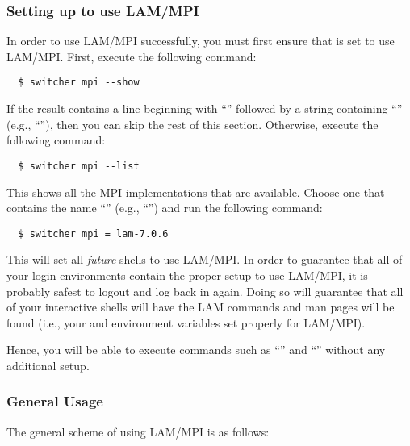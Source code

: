 \subsubsection{Setting up  to use LAM/MPI}

In order to use LAM/MPI successfully, you must first ensure that
 is set to use LAM/MPI.  First, execute the following
command:

\begin{verbatim}
  $ switcher mpi --show
\end{verbatim}
  
If the result contains a line beginning with ``''
followed by a string containing ``'' (e.g.,
``''), then you can skip the rest of this section.
Otherwise, execute the following command:

\begin{verbatim}
  $ switcher mpi --list
\end{verbatim}

This shows all the MPI implementations that are available.  Choose one
that contains the name ``'' (e.g., ``'') and
run the following command:

\begin{verbatim}
  $ switcher mpi = lam-7.0.6
\end{verbatim}

This will set all {\em future} shells to use LAM/MPI.  In order to
guarantee that all of your login environments contain the proper setup
to use LAM/MPI, it is probably safest to logout and log back in again.
Doing so will guarantee that all of your interactive shells will have
the LAM commands and man pages will be found (i.e., your 
and  environment variables set properly for LAM/MPI).

Hence, you will be able to execute commands such as ``''
and ``'' without any additional setup.

\subsubsection{General Usage}

The general scheme of using LAM/MPI is as follows:

